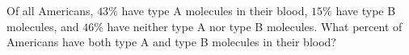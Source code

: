 Of all Americans, $43\%$ have type A molecules in their blood, $15\%$ have type B molecules, and $46\%$ have neither type A nor type B molecules. What percent of Americans have both type A and type B molecules in their blood?
